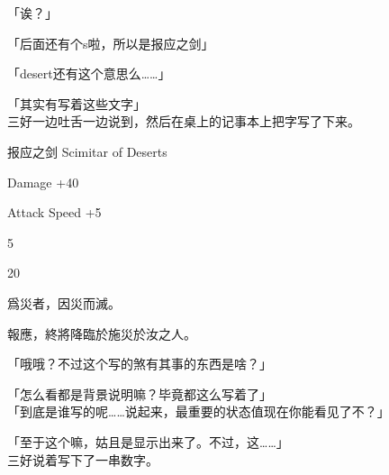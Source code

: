 「诶？」

「后面还有个s啦，所以是报应之剑」

「desert还有这个意思么……」

「其实有写着这些文字」\\

三好一边吐舌一边说到，然后在桌上的记事本上把字写了下来。\\

\cardline

  报应之剑  Scimitar of Deserts

%  
 

  Damage +40%

  Attack Speed +5%

  5%

  20%

%  
 

  爲災者，因災而滅。

  報應，終將降臨於施災於汝之人。

\cardline

「哦哦？不过这个写的煞有其事的东西是啥？」

「怎么看都是背景说明嘛？毕竟都这么写着了」\\

「到底是谁写的呢……说起来，最重要的状态值现在你能看见了不？」

「至于这个嘛，姑且是显示出来了。不过，这……」\\

三好说着写下了一串数字。\\

